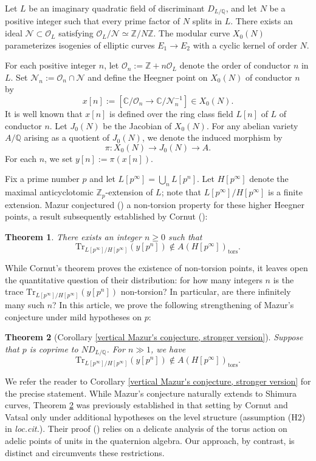 \documentclass[11pt,oneside,reqno]{amsart}
\newcommand{\Trrm}{\mathrm{Tr}}
\newcommand{\C}{\mathbb{C}}
\newcommand{\Q}{\mathbb{Q}}
\newcommand{\Z}{\mathbb{Z}}
\newcommand{\Ncal}{\mathcal{N}}
\newcommand{\Ocal}{\mathcal{O}}
\theoremstyle{plain}
\newtheorem{theorem}{Theorem}[section]
\begin{document}
	
	
	
	Let $L$ be an imaginary quadratic field of discriminant $D_{L/\Q}$, and let $N$ be a positive integer such that every prime factor of $N$ splits in $L$. There exists an ideal $\Ncal\subset\Ocal_L$ satisfying $\Ocal_L/\Ncal\simeq\Z/N\Z$. The modular curve $X_0(N)$ parameterizes isogenies of elliptic curves $E_1\to E_2$ with a cyclic kernel of order $N$.
	
	For each positive integer $n$, let $\Ocal_n:=\Z+n\Ocal_L$ denote the order of conductor $n$ in $L$. Set $\Ncal_n:=\Ocal_n\cap\Ncal$ and define the Heegner point on $X_0(N)$ of conductor $n$ by
	\[
	x[n]:=
	[\C/\Ocal_n\to\C/\Ncal_n^{-1}]\in X_0(N).
	\]
	It is well known that $x[n]$ is defined over the ring class field $L[n]$ of $L$ of conductor $n$. Let $J_0(N)$ be the Jacobian of $X_0(N)$. For any abelian variety $A/\Q$ arising as a quotient of $J_0(N)$, we denote the induced morphism by
	\[
	\pi\colon X_0(N)\to J_0(N)\to A.
	\]
	For each $n$, we set $y[n]:=\pi(x[n])$.
	
	Fix a prime number $p$ and let $L[p^\infty]=\bigcup_nL[p^n]$. Let $H[p^\infty]$ denote the maximal anticyclotomic $\Z_p$-extension of $L$; note that $L[p^\infty]/H[p^\infty]$ is a finite extension.  Mazur conjectured (\cite{Mazur1983}) a non-torsion property for these higher Heegner points, a result subsequently established by Cornut (\cite{Cornut2002}):
	\begin{theorem}
		There exists an integer $n\ge0$ such that
		\[
		\Trrm_{L[p^\infty]/H[p^\infty]}(y[p^n])\notin
		A(H[p^\infty])_\mathrm{tors}.
		\]
	\end{theorem}
	
	While Cornut's theorem proves the existence of non-torsion points, it leaves open the quantitative question of their distribution: for how many integers $n$ is the trace $\Trrm_{L[p^\infty]/H[p^\infty]}(y[p^n])$ non-torsion? In particular, are there infinitely many such $n$? In this article, we prove the following strengthening of Mazur's conjecture under mild hypotheses on $p$:
	
	\begin{theorem}[Corollary \ref{vertical Mazur's conjecture, stronger version}]\label{Theorem 1.2}
		Suppose that $p$ is coprime to $ND_{L/\Q}$.
		For $n\gg1$, we have
		\[
		\Trrm_{L[p^\infty]/H[p^\infty]}(y[p^n])\notin A(H[p^\infty])_\mathrm{tors}.
		\]
	\end{theorem}
	We refer the reader to Corollary \ref{vertical Mazur's conjecture, stronger version} for the precise statement. While Mazur's conjecture naturally extends to Shimura curves, Theorem \ref{Theorem 1.2} was previously established in that setting by Cornut and Vatsal \cite[Theorem 4.10]{CornutVatsal2007} only under additional hypotheses on the level structure (assumption (H2) in \emph{loc.cit.}). Their proof (\cite{CornutVatsal2005,CornutVatsal2007}) relies on a delicate analysis of the torus action on adelic points of units in the quaternion algebra. Our approach, by contrast, is distinct and circumvents these restrictions.
	
\end{document}

